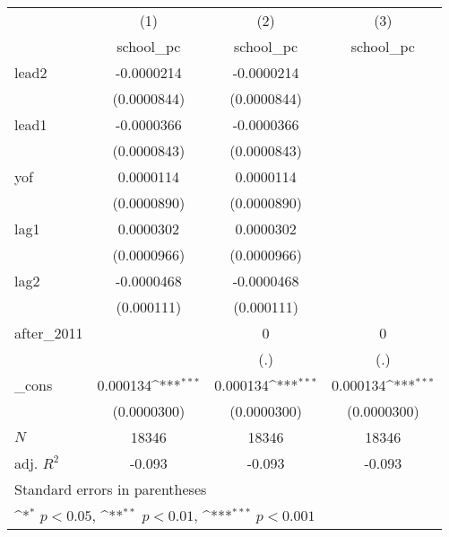{
\def\sym#1{\ifmmode^{#1}\else\(^{#1}\)\fi}
\begin{tabular}{l*{3}{c}}
\hline\hline
            &\multicolumn{1}{c}{(1)}&\multicolumn{1}{c}{(2)}&\multicolumn{1}{c}{(3)}\\
            &\multicolumn{1}{c}{school\_pc}&\multicolumn{1}{c}{school\_pc}&\multicolumn{1}{c}{school\_pc}\\
\hline
lead2       &  -0.0000214         &  -0.0000214         &                     \\
            & (0.0000844)         & (0.0000844)         &                     \\
[1em]
lead1       &  -0.0000366         &  -0.0000366         &                     \\
            & (0.0000843)         & (0.0000843)         &                     \\
[1em]
yof         &   0.0000114         &   0.0000114         &                     \\
            & (0.0000890)         & (0.0000890)         &                     \\
[1em]
lag1        &   0.0000302         &   0.0000302         &                     \\
            & (0.0000966)         & (0.0000966)         &                     \\
[1em]
lag2        &  -0.0000468         &  -0.0000468         &                     \\
            &  (0.000111)         &  (0.000111)         &                     \\
[1em]
after\_2011  &                     &           0         &           0         \\
            &                     &         (.)         &         (.)         \\
[1em]
\_cons      &    0.000134\sym{***}&    0.000134\sym{***}&    0.000134\sym{***}\\
            & (0.0000300)         & (0.0000300)         & (0.0000300)         \\
\hline
\(N\)       &       18346         &       18346         &       18346         \\
adj. \(R^{2}\)&      -0.093         &      -0.093         &      -0.093         \\
\hline\hline
\multicolumn{4}{l}{\footnotesize Standard errors in parentheses}\\
\multicolumn{4}{l}{\footnotesize \sym{*} \(p<0.05\), \sym{**} \(p<0.01\), \sym{***} \(p<0.001\)}\\
\end{tabular}
}
